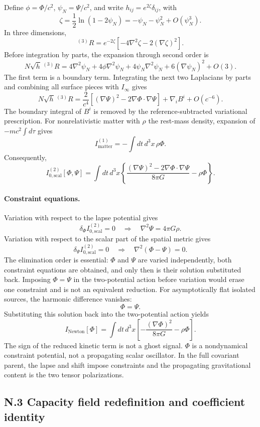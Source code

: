 \documentclass[11pt]{article}
\begin{document}
Define $\phi=\Phi/c^2$, $\psi_N=\Psi/c^2$, and write $h_{ij}=e^{2\zeta}\delta_{ij}$, with
\[
\zeta=\frac12\ln(1-2\psi_N)
=-\psi_N-\psi_N^2+O(\psi_N^3).
\]
In three dimensions,
\[
{}^{(3)}R
=e^{-2\zeta}
\left[-4\nabla^2\zeta-2(\nabla\zeta)^2\right].
\]
Before integration by parts, the expansion through second order is
\[
N\sqrt h\,{}^{(3)}R
=4\nabla^2\psi_N
+4\phi\nabla^2\psi_N
+4\psi_N\nabla^2\psi_N
+6(\nabla\psi_N)^2
+O(3).
\]
The first term is a boundary term. Integrating the next two Laplacians by parts and combining all surface pieces with $I_\infty$ gives
\[
N\sqrt h\,{}^{(3)}R
=\frac{2}{c^4}
\left[
(\nabla\Psi)^2-2\nabla\Phi\cdot\nabla\Psi
\right]
+\nabla_iB^i+O(c^{-6}).
\]
The boundary integral of $B^i$ is removed by the reference-subtracted variational prescription. For nonrelativistic matter with $\rho$ the rest-mass density, expansion of $-mc^2\int d\tau$ gives
\[
I_{\mathrm{matter}}^{(1)}
=-\int dt\,d^3x\,\rho\Phi.
\]
Consequently,
\[
\boxed{
I_{0,\mathrm{scal}}^{(2)}[\Phi,\Psi]
=
\int dt\,d^3x
\left\{
\frac{(\nabla\Psi)^2-2\nabla\Phi\cdot\nabla\Psi}{8\pi G}
-\rho\Phi
\right\}.
}
\]

\paragraph{Constraint equations.}
Variation with respect to the lapse potential gives
\[
\delta_\Phi I_{0,\mathrm{scal}}^{(2)}=0
\quad\Longrightarrow\quad
\nabla^2\Psi=4\pi G\rho.
\]
Variation with respect to the scalar part of the spatial metric gives
\[
\delta_\Psi I_{0,\mathrm{scal}}^{(2)}=0
\quad\Longrightarrow\quad
\nabla^2(\Phi-\Psi)=0.
\]
The elimination order is essential: $\Phi$ and $\Psi$ are varied independently, both constraint equations are obtained, and only then is their solution substituted back. Imposing $\Phi=\Psi$ in the two-potential action before variation would erase one constraint and is not an equivalent reduction.
For asymptotically flat isolated sources, the harmonic difference vanishes:
\[
\Phi=\Psi.
\]
Substituting this solution back into the two-potential action yields
\[
\boxed{
I_{\mathrm{Newton}}[\Phi]
=
\int dt\,d^3x
\left[
-\frac{(\nabla\Phi)^2}{8\pi G}
-\rho\Phi
\right].
}
\]
The sign of the reduced kinetic term is not a ghost signal. $\Phi$ is a nondynamical constraint potential, not a propagating scalar oscillator. In the full covariant parent, the lapse and shift impose constraints and the propagating gravitational content is the two tensor polarizations.

\subsection*{N.3 Capacity field redefinition and coefficient identity}
\end{document}
